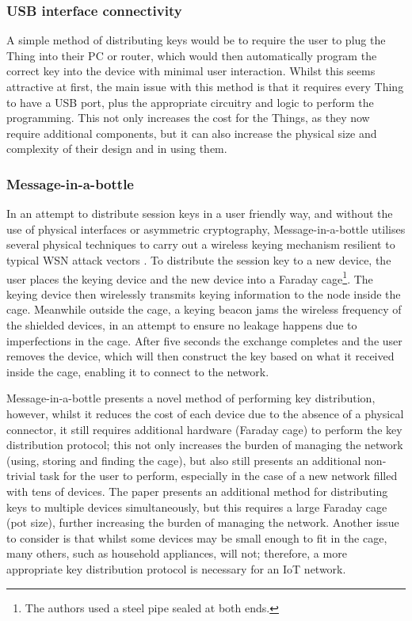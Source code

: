 \documentclass{mprop}
\begin{document}
\subsubsection{USB interface connectivity} %
\label{ssub:usb_interface_connectivity}
A simple method of distributing keys would be to require the user to plug the Thing into their PC or router, which would then automatically program the correct key into the device with minimal user interaction. Whilst this seems attractive at first, the main issue with this method is that it requires every Thing to have a USB port, plus the appropriate circuitry and logic to perform the programming. This not only increases the cost for the Things, as they now require additional components, but it can also increase the physical size and complexity of their design and in using them.

\subsubsection{Message-in-a-bottle} %
\label{ssub:message_in_a_bottle}
In an attempt to distribute session keys in a user friendly way, and without the use of physical interfaces or asymmetric cryptography, Message-in-a-bottle utilises several physical techniques to carry out a wireless keying mechanism resilient to typical WSN attack vectors \cite{MessageBottle}. To distribute the session key to a new device, the user places the keying device and the new device into a Faraday cage\footnote{The authors used a steel pipe sealed at both ends.}. The keying device then wirelessly transmits keying information to the node inside the cage. Meanwhile outside the cage, a keying beacon jams the wireless frequency of the shielded devices, in an attempt to ensure no leakage happens due to imperfections in the cage. After five seconds the exchange completes and the user removes the device, which will then construct the key based on what it received inside the cage, enabling it to connect to the network.

Message-in-a-bottle presents a novel method of performing key distribution, however, whilst it reduces the cost of each device due to the absence of a physical connector, it still requires additional hardware (Faraday cage) to perform the key distribution protocol; this not only increases the burden of managing the network (using, storing and finding the cage), but also still presents an additional non-trivial task for the user to perform, especially in the case of a new network filled with tens of devices. The paper presents an additional method for distributing keys to multiple devices simultaneously, but this requires a large Faraday cage (pot size), further increasing the burden of managing the network. Another issue to consider is that whilst some devices may be small enough to fit in the cage, many others, such as household appliances, will not; therefore, a more appropriate key distribution protocol is necessary for an IoT network.
\end{document}
